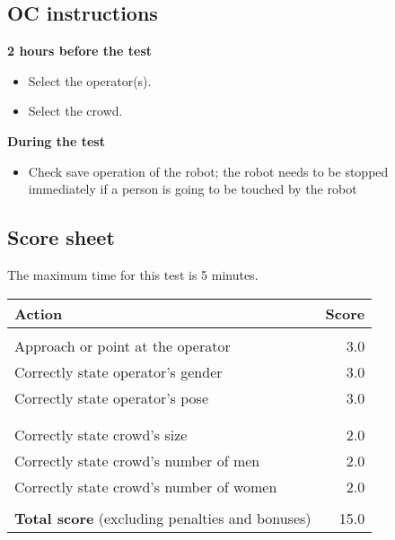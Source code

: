 %

\subsection{OC instructions}

\textbf{2 hours before the test}
\begin{itemize}
\item Select the  operator(s).
\item Select the crowd.
\end{itemize}

\textbf{During the test}
\begin{itemize}
\item Check save operation of the robot; the robot needs to be stopped immediately if a person is going to be touched by the robot
\end{itemize}

\subsection{Score sheet}
The maximum time for this test is 5 minutes.

\begin{tabularx}{\textwidth}{ X r }
	\textbf{Action} & \textbf{Score} \\ \hline
	\textbi{Operator}  \\
	Approach or point at the operator & 3.0 \\
	Correctly state operator's gender & 3.0 \\
	Correctly state operator's pose & 3.0 \\
	\\
	\textbi{Crowd} \\
	Correctly state crowd's size & 2.0 \\
	Correctly state crowd's number of men & 2.0 \\
	Correctly state crowd's number of women & 2.0 \\
	\\ \hline
	\textbf{Total score} (excluding penalties and bonuses) & 15.0 \\
\end{tabularx}


